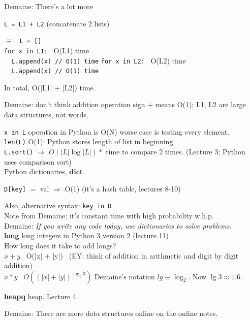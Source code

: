 \documentclass[10pt]{amsart}
\begin{document}
\begin{multicols*}{2}
Demaine: There's a lot more 

\verb|L = L1 + L2| (concatenate 2 lists)

$\equiv $ \verb| L = [] | \\

\verb|for x in L1:| \quad \quad \, O(L1) time \\
\verb|  L.append(x) // O(1) time|
\verb|for x in L2:| \quad \quad \, O(L2) time \\
\verb|  L.append(x) // O(1) time|

In total, O(|L1| + |L2|) time.

Demaine: don't think addition operation sign $+$ means O(1); L1, L2 are large data structures, not words.

\verb|x in L| operation in Python is O(N) worse case is testing every element. \\

\verb|len(L)| O(1): Python stores length of list in beginning. \\

\verb|L.sort()| $\Longrightarrow$ $O(|L| \log{ |L|}) * $ time to compare 2 times.  (Lecture 3; Python uses comparison sort) \\

Python dictionaries, \textbf{dict}.

\verb|D[key]| $=$ val $\Longrightarrow$ O(1) (it's a hash table, lectures 8-10)

Also, alternative syntax: \verb|key in D| \\

Note from Demaine: it's constant time with high probability w.h.p. \\

Demaine: \emph{If you write any code today, use dictionaries to solve problems.} \\

\textbf{long} long integers in Python 3 version 2 (lecture 11) \\

How long does it take to add longs? \\
$x+ y$ \quad \, O(|x| + |y|) \quad \, (EY: think of addition in arithmetic and digit by digit addition)  \\

$x * y$ \quad \, $O((|x| + |y|)^{\log_2{3}})$  Demaine's notation $lg \equiv \log_2$. Now $\lg{3} \approx 1.6$.

\textbf{heapq} heap. Lecture 4.

Demaine: There are more data structures online on the online notes.


\end{multicols*}
\end{document}
